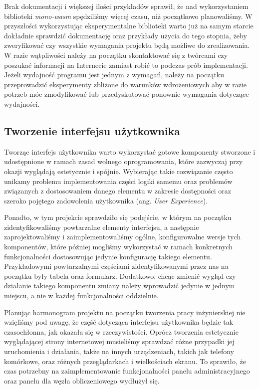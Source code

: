 \documentclass[a4paper,11pt,twoside]{report}
\theoremstyle{definition}
\begin{document}
            Brak dokumentacji i większej ilości przykładów sprawił, że nad wykorzystaniem biblioteki \textit{mono-wasm} spędziliśmy więcej czasu, niż początkowo planowaliśmy.
            W przyszłości wykorzystując eksperymentalne biblioteki warto już na samym starcie dokładnie sprawdzić dokumentację oraz przykłady użycia do tego stopnia, żeby zweryfikować czy wszystkie wymagania projektu będą możliwe do zrealizowania. W razie wątpliwości należy na początku skontaktować się z twórcami czy poszukać informacji na Internecie zamiast robić to podczas prób implementacji.
            Jeżeli wydajność programu jest jednym z wymagań, należy na początku przeprowadzić eksperymenty zbliżone do warunków wdrożeniowych aby w razie potrzeb móc zmodyfikować lub przedyskutować ponownie wymagania dotyczące wydajności.
        
        \subsection{Tworzenie interfejsu użytkownika}
            Tworząc interfejs użytkownika warto wykorzystać gotowe komponenty stworzone i udostępnione w ramach zasad wolnego oprogramowania, które zazwyczaj przy okazji wyglądają estetycznie i spójnie. Wybierając takie rozwiązanie często unikamy problemu implementowania części logiki samemu oraz problemów związanych z dostosowaniem danego elementu w zakresie dostępności oraz szeroko pojętego zadowolenia użytkownika (ang. {\textit{User Experience})}.
            
            Ponadto, w tym projekcie sprawdziło się podejście, w którym na początku zidentyfikowaliśmy powtarzalne elementy interfejsu, a następnie zaprojektowaliśmy i zaimplementowaliśmy ogólne, konfigurowalne wersje tych komponentów, które później mogliśmy wykorzystać w ramach konkretnych funkcjonalności dostosowując jedynie konfigurację takiego elementu.
            Przykładowymi powtarzalnymi częściami zidentyfikowanymi przez nas na początku były tabela oraz formularz. Dodatkowo, chcąc zmienić wygląd czy działanie takiego komponentu zmiany należy wprowadzić jedynie w jednym miejscu, a nie w każdej funkcjonalności oddzielnie.
        
            Planując harmonogram projektu na początku tworzenia pracy inżynierskiej nie wzięliśmy pod uwagę, że część dotycząca interfejsu użytkownika będzie tak czasochłonna, jak okazała się w rzeczywistości.
            Oprócz tworzenia estetycznie wyglądającej strony internetowej musieliśmy sprawdzać różne przypadki jej uruchomienia i działania, także na innych urządzeniach, takich jak telefony komórkowe, oraz różnych przeglądarkach i wielkościach ekranu. To sprawiło, że czas potrzebny na zaimplementowanie funkcjonalności panelu administracyjnego oraz panelu dla węzła obliczeniowego wydłużył się.
            
\end{document}
